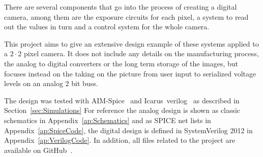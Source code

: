 
There are several components that go into the process of creating a digital camera,
among them are the exposure circuits for each pixel, a system to read out the values in turn
and a control system for the whole camera.

This project aims to give an extensive design example of these systems applied to a $2 \cdot 2$ pixel camera.
It does not include any details on the manufacturing process, the analog to digital converters or the long term storage of the images, but focuses instead
on the taking on the picture from user input to serialized voltage levels on an analog 2 bit buss.

The design was tested with AIM-Spice~\cite{AIMSpice} and Icarus~verilog~\cite{icarusVL} as described in Section~\ref{sec:Simulations}
For reference the analog design is shown as classic schematics in Appendix~\ref{ap:Schematics} and as SPICE net lists in Appendix~\ref{ap:SpiceCode}, the digital design is defined in SystemVerilog 2012 in Appendix~\ref{ap:VerilogCode}.
In addition, all files related to the project are available on GitHub~\cite{githubProject}.